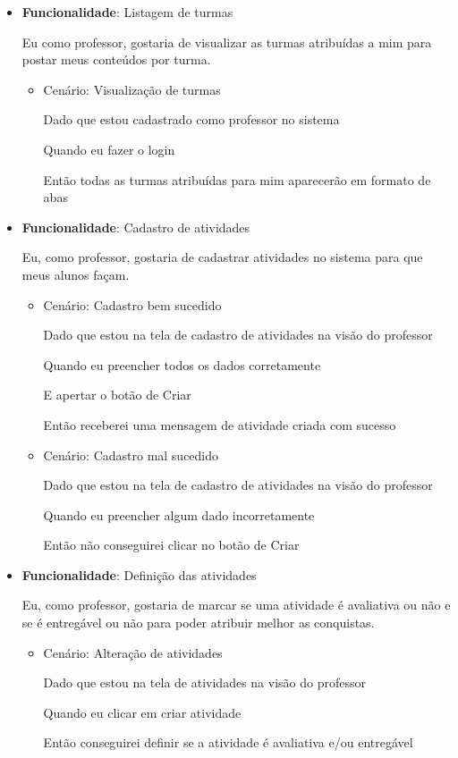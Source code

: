\documentclass[
    12pt,               %
    openright,          %
    oneside,
    a4paper,            %
    english,            %
    brazil              %
    ]{ifsp-spo-inf-ctds} %
\begin{document}
\begin{itemize}
\item\textbf{Funcionalidade}: Listagem de turmas
    
    Eu como professor, gostaria de visualizar as turmas atribuídas a mim para postar meus conteúdos por turma.
    \begin{itemize}
        \item Cenário: Visualização de turmas 
        \par Dado que estou cadastrado como professor no sistema
        \par Quando eu fazer o login
        \par Então todas as turmas atribuídas para mim aparecerão em formato de abas
    \end{itemize}  

\item\textbf{Funcionalidade}: Cadastro de atividades
    
    Eu, como professor, gostaria de cadastrar atividades no sistema para que meus alunos façam.
    \begin{itemize}
        \item Cenário: Cadastro bem sucedido  
        \par Dado que estou na tela de cadastro de atividades na visão do professor
        \par Quando eu preencher todos os dados corretamente
        \par E apertar o botão de Criar
        \par Então receberei uma mensagem de atividade criada com sucesso
    \end{itemize}   
    \begin{itemize}
        \item Cenário: Cadastro mal sucedido  
        \par Dado que estou na tela de cadastro de atividades na visão do professor
        \par Quando eu preencher algum dado incorretamente
        \par Então não conseguirei clicar no botão de Criar
    \end{itemize}   

\item\textbf{Funcionalidade}: Definição das atividades
    
    Eu, como professor, gostaria de marcar se uma atividade é avaliativa ou não e se é entregável ou não para poder atribuir melhor as conquistas.
    \begin{itemize}
        \item Cenário: Alteração de atividades  
        \par Dado que estou na tela de atividades na visão do professor
        \par Quando eu clicar em criar atividade 
        \par Então conseguirei definir se a atividade é avaliativa e/ou entregável
    \end{itemize}


\end{itemize}
\end{document}
